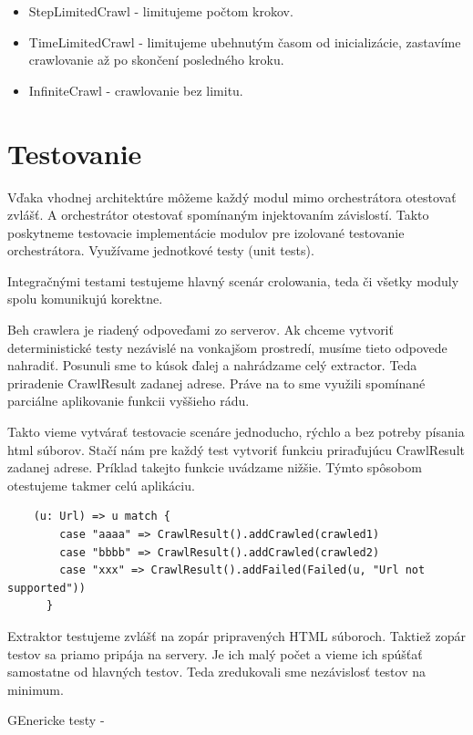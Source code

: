 \begin{itemize}
    \item StepLimitedCrawl - limitujeme počtom krokov.
    \item TimeLimitedCrawl - limitujeme ubehnutým časom od inicializácie, zastavíme crawlovanie až po skončení posledného kroku. 
    \item InfiniteCrawl - crawlovanie bez limitu.
\end{itemize}


\section{Testovanie}
Vďaka vhodnej architektúre môžeme každý modul mimo orchestrátora otestovať zvlášť. A orchestrátor otestovať spomínaným injektovaním závislostí. Takto poskytneme testovacie implementácie modulov pre izolované testovanie orchestrátora. Využívame jednotkové testy (unit tests). 

Integračnými testami testujeme hlavný scenár crolowania, teda či všetky moduly spolu komunikujú korektne. 

Beh crawlera je riadený odpoveďami zo serverov. Ak chceme vytvoriť deterministické testy nezávislé na vonkajšom prostredí, musíme tieto odpovede nahradiť. Posunuli sme to kúsok ďalej a nahrádzame celý extractor. Teda priradenie CrawlResult zadanej adrese. Práve na to sme využili spomínané parciálne aplikovanie funkcii vyššieho rádu.

Takto vieme vytvárať testovacie scenáre jednoducho, rýchlo a bez potreby písania html súborov. Stačí nám pre každý test vytvoriť funkciu priraďujúcu CrawlResult zadanej adrese. Príklad takejto funkcie uvádzame nižšie. Týmto spôsobom otestujeme takmer celú aplikáciu.

\begin{lstlisting}
    (u: Url) => u match {
        case "aaaa" => CrawlResult().addCrawled(crawled1)
        case "bbbb" => CrawlResult().addCrawled(crawled2)
        case "xxx" => CrawlResult().addFailed(Failed(u, "Url not supported"))
      }
\end{lstlisting}


Extraktor testujeme zvlášť na zopár pripravených HTML súboroch. Taktiež zopár testov sa priamo pripája na servery. Je ich malý počet a vieme ich spúšťať samostatne od hlavných testov. Teda zredukovali sme nezávislosť testov na minimum. 

GEnericke testy - 


